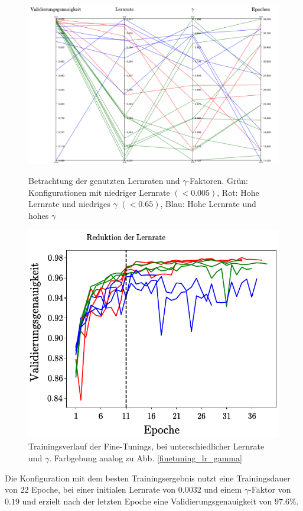 \begin{figure}[h]
\includegraphics[scale=0.58]{NNOPT/finetuning_lr_gamma.pdf}
\caption{Betrachtung der genutzten Lernraten und $\gamma$-Faktoren. Grün: Konfigurationen mit niedriger Lernrate $(<0.005)$, Rot: Hohe Lernrate und niedriges $\gamma$ $(<0.65)$, Blau: Hohe Lernrate und hohes $\gamma$}
\label{finetuning_lr_gamma}

\centering
\includegraphics[scale=1]{NNOPT/finetuning_lr_gamma_verlauf.pdf}
\caption{Trainingsverlauf der Fine-Tunings, bei unterschiedlicher Lernrate und $\gamma$. Farbgebung analog zu Abb. \ref{finetuning_lr_gamma}}
\label{finetuning_lr_gamma_verlauf}
\end{figure}
\clearpage
Die Konfiguration mit dem besten Trainingsergebnis nutzt eine Trainingsdauer von $22$ Epoche, bei einer initialen Lernrate von $0.0032$ und einem $\gamma$-Faktor von $0.19$ und erzielt nach der letzten Epoche eine Validierungsgenauigkeit von $97.6\%$.
